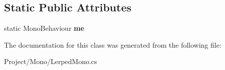 \subsection*{Static Public Attributes}
\begin{DoxyCompactItemize}
\item 
\mbox{\label{class_lerp2_a_p_i_1_1_mono_1_1_lerped_mono_a230428e35a8be741c1c220da4f5aea91}} 
static Mono\+Behaviour {\bfseries me}
\end{DoxyCompactItemize}


The documentation for this class was generated from the following file\+:\begin{DoxyCompactItemize}
\item 
Project/\+Mono/Lerped\+Mono.\+cs\end{DoxyCompactItemize}
